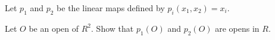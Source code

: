 Let $p_1$ and $p_2$ be the linear maps defined by $p_i(x_1, x_2) = x_i$.

Let $O$ be an open of $R^2$. Show that $p_1(O)$ and $p_2(O)$ are opens in $R$.